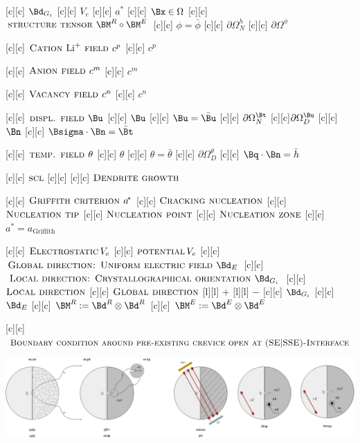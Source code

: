 [c][c] {$\Bd_{G_{i}}$}
[c][c] {\tiny $V_{e}$}
[c][c] {\tiny $a^{\!\ast}$}
[c][c] {\tiny $\Bx \in \Omega$}
[c][c] {$\textsc{structure tensor } \BM^{R} \circ \BM^{E}$}
[c][c] {$\phi=\bar{\phi}$}
[c][c]  {$\partial\Omega^{h}_{N}$}
[c][c]  {$\partial\Omega^{\phi}$}

[c][c] {\scriptsize $\textsc{Cation } \text{Li}^{+} \textsc{ field }  c^{p}$}
[c][c]  {$c^{p}$}

[c][c] {\scriptsize $\textsc{Anion field } c^{m}$}
[c][c]     {$c^{m}$}

[c][c] {\scriptsize $\textsc{Vacancy field } c^{n}$}
[c][c]     {$c^{n}$}

[c][c] {\tiny $\textsc{displ. field } \Bu$}
[c][c]   {\tiny $\Bu$}
[c][c] {$\Bu=\bar{\Bu}$}
[c][c]  {$\partial\Omega^{\Bt}_{N}$}
[c][c]{$\partial\Omega^{\Bu}_{D}$}
[c][c]    {$\Bn$}
[c][c] {$\Bsigma\cdot\Bn = \bar{\Bt}$}

[c][c]  {\tiny $\textsc{temp. field } \theta$}
[c][c]    {\tiny $\theta$}
[c][c] {$\theta = \bar{\theta}$}
[c][c]  {$\partial\Omega^{\theta}_{D}$}
[c][c]  {$\Bq\cdot\Bn = \bar{h}$}

[c][c] {\tiny $\textsc{scl}$}
[c][c]  {}
[c][c] {\tiny $\textsc{Dendrite growth}$}

[c][c] {\tiny $\textsc{Griffith criterion } a^{\!\ast}$}
[c][c] {\tiny $\textsc{Cracking nucleation}$}
[c][c] {\tiny $\textsc{Nucleation tip}$}
[c][c] {\tiny $\textsc{Nucleation point}$}
[c][c] {\tiny $\textsc{Nucleation zone}$}
[c][c] {\tiny $a^{\!\ast}\!\!=\!a_{\text{Griffith}}$}

[c][c] {\tiny $\textsc{Electrostatic}\, V_{e}$}
[c][c]    {\tiny $\textsc{potential}\, V_{e}$}
[c][c] {\tiny $\textsc{Global direction: Uniform electric field } \Bd_{E}$}
[c][c] {\tiny $\textsc{Local direction:  Crystallographical orientation } \Bd_{G_{i}}$}
[c][c] {\tiny $\textsc{Local direction}$}
[c][c] {\tiny $\textsc{Global direction}$}
[l][l]  {\tiny $+$}
[l][l]  {\tiny $-$}
[c][c] {\tiny $\Bd_{G_{i}}$}
[c][c] {\tiny $\Bd_{E}$}
[c][c] {$\BM^{R} := \Bd^{R} \otimes \Bd^{R}$}
[c][c] {$\BM^{E} := \Bd^{E} \otimes \Bd^{E}$}

[c][c] {\scriptsize $\textsc{Boundary condition around pre-existing crevice open at (SE$|$SSE)-Interface}$}

\includegraphics[width=1.01\textwidth]{structuralfivefields_multi_edited.eps}